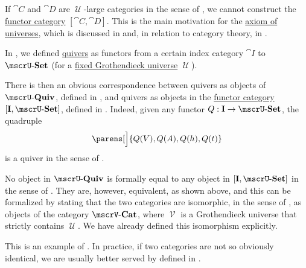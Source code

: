 \begin{remark}\label{rem:functor_category_size}
  If \( \cat{C} \) and \( \cat{D} \) are \( \mscrU \)-large categories in the sense of , we cannot construct the \hyperref[def:functor_category]{functor category} \( [\cat{C}, \cat{D}] \). This is the main motivation for the \hyperref[def:axiom_of_universes]{axiom of universes}, which is discussed in  and, in relation to category theory, in .
\end{remark}

\begin{example}\label{ex:isomorphism_of_categories}
  In , we defined \hyperref[def:quiver]{quivers} as functors from a certain index category \( \cat{I} \) to \( \ucat{Set} \) (for a \hyperref[def:category_size]{fixed Grothendieck universe} \( \mscrU \)).

  There is then an obvious correspondence between quivers as objects of \hyperref[def:category_of_small_quivers]{\( \ucat{Quiv} \)}, defined in , and quivers as objects in the \hyperref[def:functor_category]{functor category} \( [\cat{I}, \ucat{Set}] \), defined in . Indeed, given any functor \( Q: \cat{I} \to \ucat{Set} \), the quadruple
  \begin{equation*}
    \parens[\Big]{ Q(V), Q(A), Q(h), Q(t) }
  \end{equation*}
  is a quiver in the sense of .

  No object in \( \ucat{Quiv} \) is formally equal to any object in \( [\cat{I}, \ucat{Set}] \) in the sense of \hyperref[def:zfc]{}. They are, however, equivalent, as shown above, and this can be formalized by stating that the two categories are isomorphic, in the sense of , as objects of the category \( \ucat[\mscrV]{Cat} \), where \( \mscrV \) is a Grothendieck universe that strictly contains \( \mscrU \). We have already defined this isomorphism explicitly.

  This is an example of . In practice, if two categories are not so obviously identical, we are usually better served by  defined in .
\end{example}

